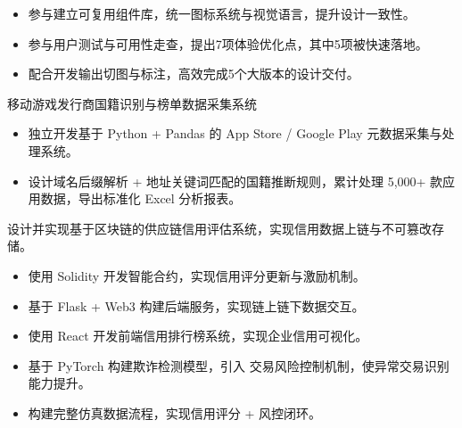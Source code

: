 


\begin{itemize}
  \item 参与建立可复用组件库，统一图标系统与视觉语言，提升设计一致性。
  \item 参与用户测试与可用性走查，提出7项体验优化点，其中5项被快速落地。
  \item 配合开发输出切图与标注，高效完成5个大版本的设计交付。
\end{itemize}
移动游戏发行商国籍识别与榜单数据采集系统
\begin{itemize}
  \item 独立开发基于 Python + Pandas 的 App Store / Google Play 元数据采集与处理系统。
  \item 设计域名后缀解析 + 地址关键词匹配的国籍推断规则，累计处理 5,000+ 款应用数据，导出标准化 Excel 分析报表。
\end{itemize}


设计并实现基于区块链的供应链信用评估系统，实现信用数据上链与不可篡改存储。
\begin{itemize}
  \item 使用 Solidity 开发智能合约，实现信用评分更新与激励机制。
  \item 基于 Flask + Web3 构建后端服务，实现链上链下数据交互。
  \item 使用 React 开发前端信用排行榜系统，实现企业信用可视化。
  \item 基于 PyTorch 构建欺诈检测模型，引入 交易风险控制机制，使异常交易识别能力提升。
  \item 构建完整仿真数据流程，实现信用评分 + 风控闭环。
\end{itemize}

